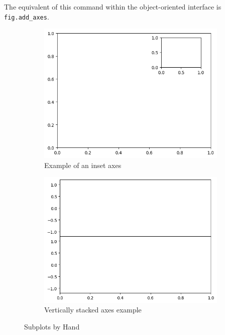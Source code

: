 The equivalent of this command within the object-oriented interface is \verb|fig.add_axes|.
\begin{figure}
    \centering
    \begin{subfigure}[b]{.45\textwidth}
        \includegraphics[width=\textwidth]{../img/Example of an inset axes.png}
        \caption{Example of an inset axes}
        \label{Example of an inset axes}
    \end{subfigure}
    \hfill
    \begin{subfigure}[b]{.45\textwidth}
        \includegraphics[width=\textwidth]{../img/Vertically stacked axes example.png}
        \caption{Vertically stacked axes example}
        \label{Vertically stacked axes example}
    \end{subfigure}
    \caption{Subplots by Hand}
\end{figure}
